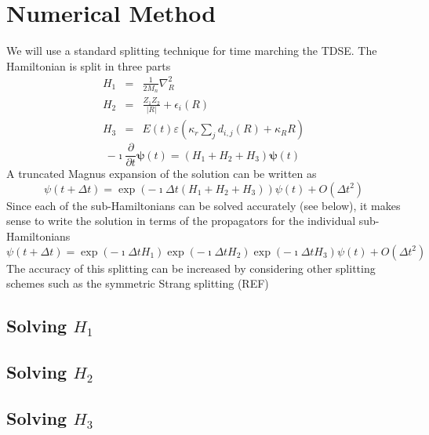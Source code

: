 \documentclass[a4paper]{article}
\begin{document}
\section{Numerical Method}
We will use a standard splitting technique for time marching the TDSE. The Hamiltonian is split in three parts
\begin{eqnarray}
	H_1 &=& \frac{1}{2 M_n} \nabla^2_R \\
	H_2 &=& \frac{Z_1 Z_2}{|R|} + \epsilon_i(R) \\
	H_3 &=& E(t) \varepsilon \left( \kappa_r \sum_j d_{i, j}(R) + \kappa_R R \right)
\end{eqnarray}
\begin{equation}
	- \imath \frac{\partial}{\partial t} \mathbf{\psi}(t) = (H_1 + H_2 + H_3) \mathbf{\psi}(t)
\end{equation}
A truncated Magnus expansion of the solution can be written as
\begin{equation}
 	\psi(t + \Delta t) = \exp( - \imath \Delta t (H_1 + H_2 + H_3) ) \psi(t) + O(\Delta t^2)
\end{equation}
Since each of the sub-Hamiltonians can be solved accurately (see below), it makes sense to write the solution in terms of the propagators for the individual sub-Hamiltonians
\begin{equation}
	\psi(t + \Delta t) = \exp(- \imath \Delta t H_1) \exp(- \imath \Delta t H_2) \exp(- \imath \Delta t H_3) \psi(t) + O(\Delta t^2)
\end{equation}
The accuracy of this splitting can be increased by considering other splitting schemes such as the symmetric Strang splitting (REF)

\subsection{Solving $H_1$}
\subsection{Solving $H_2$}
\subsection{Solving $H_3$}
\end{document}
